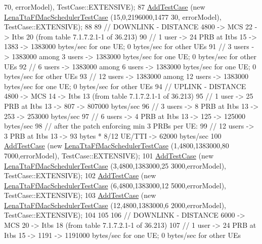 \begin{DoxyCode}
      70, errorModel), TestCase::EXTENSIVE);
87   \hyperlink{classns3_1_1TestCase_a3718088e3eefd5d6454569d2e0ddd835}{AddTestCase} (\textcolor{keyword}{new} \hyperlink{classLenaTtaFfMacSchedulerTestCase}{LenaTtaFfMacSchedulerTestCase} (15,0,2196000,1477
      30, errorModel), TestCase::EXTENSIVE);
88 
89   \textcolor{comment}{// DOWNLINK - DISTANCE 4800 -> MCS 22 -> Itbs 20 (from table 7.1.7.2.1-1 of 36.213)}
90   \textcolor{comment}{// 1 user -> 24 PRB at Itbs 15 -> 1383 -> 1383000 bytes/sec for one UE; 0 bytes/sec for other UEs}
91   \textcolor{comment}{// 3 users -> 1383000 among 3 users -> 1383000 bytes/sec for one UE; 0 bytes/sec for other UEs}
92   \textcolor{comment}{// 6 users -> 1383000 among 6 users -> 1383000 bytes/sec for one UE; 0 bytes/sec for other UEs}
93   \textcolor{comment}{// 12 users -> 1383000 among 12 users -> 1383000 bytes/sec for one UE; 0 bytes/sec for other UEs}
94   \textcolor{comment}{// UPLINK - DISTANCE 4800 -> MCS 14 -> Itbs 13 (from table 7.1.7.2.1-1 of 36.213)}
95   \textcolor{comment}{// 1 user -> 25 PRB at Itbs 13 -> 807 -> 807000 bytes/sec}
96   \textcolor{comment}{// 3 users -> 8 PRB at Itbs 13 -> 253 -> 253000 bytes/sec}
97   \textcolor{comment}{// 6 users -> 4 PRB at Itbs 13 -> 125 -> 125000 bytes/sec}
98   \textcolor{comment}{// after the patch enforcing min 3 PRBs per UE:}
99   \textcolor{comment}{// 12 users -> 3 PRB at Itbs 13 -> 93  bytes * 8/12 UE/TTI  -> 62000 bytes/sec}
100   \hyperlink{classns3_1_1TestCase_a3718088e3eefd5d6454569d2e0ddd835}{AddTestCase} (\textcolor{keyword}{new} \hyperlink{classLenaTtaFfMacSchedulerTestCase}{LenaTtaFfMacSchedulerTestCase} (1,4800,1383000,80
      7000,errorModel), TestCase::EXTENSIVE);
101   \hyperlink{classns3_1_1TestCase_a3718088e3eefd5d6454569d2e0ddd835}{AddTestCase} (\textcolor{keyword}{new} \hyperlink{classLenaTtaFfMacSchedulerTestCase}{LenaTtaFfMacSchedulerTestCase} (3,4800,1383000,25
      3000,errorModel), TestCase::EXTENSIVE);
102   \hyperlink{classns3_1_1TestCase_a3718088e3eefd5d6454569d2e0ddd835}{AddTestCase} (\textcolor{keyword}{new} \hyperlink{classLenaTtaFfMacSchedulerTestCase}{LenaTtaFfMacSchedulerTestCase} (6,4800,1383000,12
      5000,errorModel), TestCase::EXTENSIVE);
103   \hyperlink{classns3_1_1TestCase_a3718088e3eefd5d6454569d2e0ddd835}{AddTestCase} (\textcolor{keyword}{new} \hyperlink{classLenaTtaFfMacSchedulerTestCase}{LenaTtaFfMacSchedulerTestCase} (12,4800,1383000,6
      2000,errorModel), TestCase::EXTENSIVE);
104 
105 
106   \textcolor{comment}{// DOWNLINK - DISTANCE 6000 -> MCS 20 -> Itbs 18 (from table 7.1.7.2.1-1 of 36.213)}
107   \textcolor{comment}{// 1 user -> 24 PRB at Itbs 15 -> 1191 -> 1191000 bytes/sec for one UE; 0 bytes/sec for other UEs}

\end{DoxyCode}
